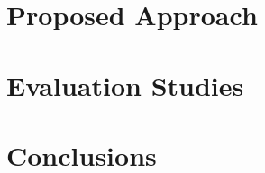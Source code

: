 \documentclass[letterpaper, 10 pt, conference]{ieeeconf}
\begin{document}
\section{Proposed Approach}\label{sec:approach}


\section{Evaluation Studies}\label{sec:evaluation}


\section{Conclusions}\label{sec:conclusions}







\end{document}
